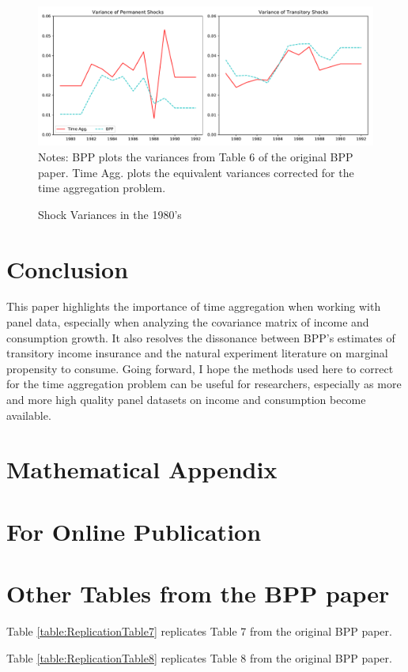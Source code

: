 \documentclass[AER]{AEA}
\begin{document}


\begin{figure}
	\includegraphics[width=1\textwidth]{../Code/Figures/ShockVariances1980s.pdf}
	\footnotesize Notes: BPP plots the variances from Table 6 of the original BPP paper. Time Agg. plots the equivalent variances corrected for the time aggregation problem.
	\caption{Shock Variances in the 1980's}
	\label{figure:shockVariance}
\end{figure}

\section{Conclusion}
This paper highlights the importance of time aggregation when working with panel data, especially when analyzing the covariance matrix of income and consumption growth. It also resolves the dissonance between BPP's estimates of transitory income insurance and the natural experiment literature on marginal propensity to consume. Going forward, I hope the methods used here to correct for the time aggregation problem can be useful for researchers, especially as more and more high quality panel datasets on income and consumption become available.




\appendix

\section{Mathematical Appendix}

\section{For Online Publication}




\section{Other Tables from the BPP paper} \label{table_appendix}
Table \ref{table:ReplicationTable7} replicates Table 7 from the original BPP paper.

 

Table \ref{table:ReplicationTable8} replicates Table 8 from the original BPP paper.
\end{document}
